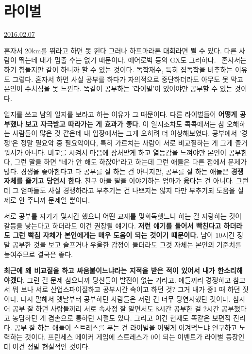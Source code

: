 \section{라이벌}
\href{https://www.kockoc.com/Apoc/626811}{2016.02.07}

\vspace{5mm}

혼자서 20km를 뛰라고 하면 못 뛴다
그러나 하프마라톤 대회라면 뛸 수 있다. 다른 사람이 뛰는데 내가 멈출 수는 없기 때문이다.
에어로빅 등의 GX도 그러하다.  혼자서는 하기 힘들지만 같이 하니까 할 수 있는 것이다.
독학재수, 특히 집독학을 비추하는 이유도 그렇다.
혼자서 하면 사실 공부를 하다가 자의적으로 중단하더라도 아무도 못 막고 본인이 수치심을 못 느낀다.
똑같이 공부하는 '라이벌'이 있어야만 공부할 수 있는 것이다.
\vspace{5mm}

일지를 쓰고 남의 일지를 보라고 하는 이유가 그 때문이다. 다른 라이벌들이 \textbf{어떻게 공부했나 보고 자극받고 따라가는 게 효과가 좋다}.
이 일지조차도 콕콕에서는 참 오해하는 사람들이 많은 것 같은데 내 입장에서는 그게 오히려 더 이상해보였다.
공부에서 '경쟁'은 정말 필요악 중 필요악이다, 특히 가르치는 사람이 서로 비교질하는 게 그게 즐거워서가 아니다.
비교를 시켜서 마음에 상처받게 하고 열등감을 느껴야만 본인이 공부한다,
그런 말을 하면 "네가 안 해도 하잖아"라고 하는데 그런 애들은 다른 점에서 문제가 많다.
경쟁을 좋아한다고 다 공부를 잘 하는 건 아니지만, 공부를 잘 하는 애들은 \textbf{경쟁 자체를 즐기고 당연시 한다}.
친구 아들 딸을 이야기하는 엄마가 옳다는 건 아니다. 그런데 그 엄마들도 사실 경쟁하라고 부추기는 건 나쁘지는 않지
다만 부추기되 도움을 실제로 안 주니까 문제일 뿐이다.
\vspace{5mm}

서로 공부를 자기가 몇시간 했으니 어떤 교재를 몇회독햇느니 하는 걸 자랑하는 것이 갈등을 낳는다고 하더라도 이건 권장될 얘기다.
\textbf{저런 얘기를 들어서 빡친다고 하더라도 그런 빡침 자체가 본인에게는 매우 도움이 되는 것이기 때문이다.}
남이 10시간 정말 공부한 것을 보고 슬프거나 우울한 감정이 들더라도 그것 자체는 본인의 기준치를 높여주므로 결국은 좋다.
\vspace{5mm}

\textbf{최근에 왜 비교질을 하고 싸움붙이느냐라는 지적을 받은 적이 있어서 내가 한소리해야겠다.}
그런 걸 문제 삼으니까 당신들이 발전이 없는 거라고.
애들끼리 경쟁하고 참고서 뭐 보나 서로 산업스파이질하고 공부시간 속이고 하던 것?
그거 내가 중1 때 하던 짓이다. 다시 말해서 옛날부터 공부하던 사람들은 저런 건 너무 당연시했단 것이다.
심지어 공부 잘 하던 사람들끼리 서로 속사정 잘 알면서도 8시간 공부한 걸 2시간 공부했다고 농담하던 게 겸손으로 통하던 시절도 있다.
그리고 이건 현재도 똑같은 보편적 진리다.
공부 잘 하는 애들이 스트레스를 푸는 건 라이벌을 어떻게 이겨먹느냐 연구하고 노력하는 것이다.
프린세스 메이커 게임에 스트레스가 0이 되는 이벤트가 라이벌 등장인데 이건 정말 현실적인 것이다.
\vspace{5mm}

